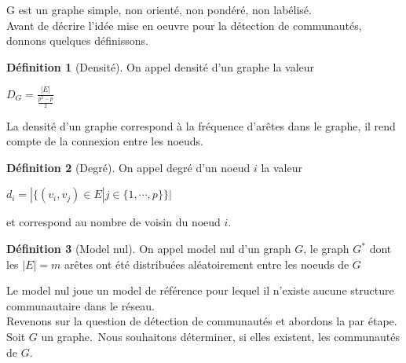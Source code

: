 \documentclass[frenchb]{report}
\newcommand{\1}{\mathbbm{1}}
\theoremstyle{definition}\newtheorem{defn}{Définition}
\theoremstyle{definition}\newtheorem{exm}{Exemple}
\theoremstyle{definition}\newtheorem{nota}{Notation}
\theoremstyle{definition}\newtheorem{rem}{Remarque}
\begin{document}
G est un graphe simple, non orienté, non pondéré, non labélisé.\\

Avant de décrire l'idée mise en oeuvre pour la détection de communautés, donnons quelques définissons.\\

\begin{defn}[Densité]
On appel densité d'un graphe la valeur 
\begin{center}
$D_G = \frac{|E|}{\frac{p^2-p}{2}} $
\end{center}
\end{defn}

La densité d'un graphe correspond à la fréquence d'arêtes dans le graphe, il rend compte de la connexion entre les noeuds.

\begin{defn}[Degré]
On appel degré d'un noeud $i$ la valeur 
\begin{center}
$d_i = |\{(v_i,v_j) \in E | j \in {\{1,\cdots,p\}} \}| $
\end{center}
\end{defn}
et correspond au nombre de voisin du noeud $i$.\\

\begin{defn}[Model nul]
On appel model nul d'un graph $G$, le graph $G^*$ dont les $|E| = m$ arêtes ont été distribuées aléatoirement entre les noeuds de $G$
\end{defn}
Le model nul joue un model de référence pour lequel il n'existe aucune structure communautaire dans le réseau.\\

Revenons sur la question de détection de communautés et abordons la par étape.
Soit $G$ un graphe.\
Nous souhaitons déterminer, si elles existent, les communautés de $G$.
\end{document}

